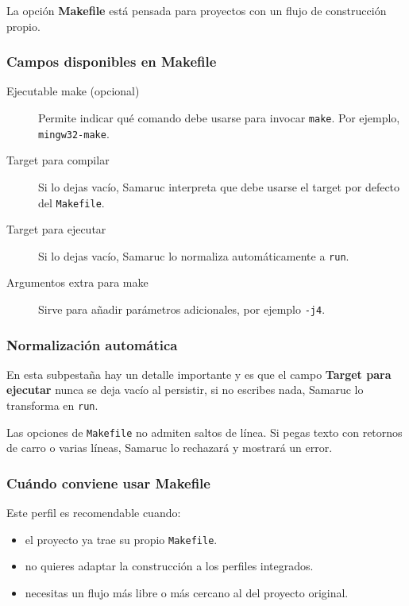 \documentclass[../../main.tex]{subfiles}
\begin{document}
La opción \textbf{Makefile} está pensada para proyectos con un flujo de construcción propio.

\subsubsection{Campos disponibles en Makefile}

\begin{description}
    \item[Ejecutable make (opcional)] Permite indicar qué comando debe usarse para invocar \texttt{make}. Por ejemplo, \texttt{mingw32-make}.
    \item[Target para compilar] Si lo dejas vacío, Samaruc interpreta que debe usarse el target por defecto del \texttt{Makefile}.
    \item[Target para ejecutar] Si lo dejas vacío, Samaruc lo normaliza automáticamente a \texttt{run}.
    \item[Argumentos extra para make] Sirve para añadir parámetros adicionales, por ejemplo \texttt{-j4}.
\end{description}

\subsubsection{Normalización automática}

En esta subpestaña hay un detalle importante y es que el campo \textbf{Target para ejecutar} nunca se deja vacío al persistir, si no escribes nada, Samaruc lo transforma en \texttt{run}.

Las opciones de \texttt{Makefile} no admiten saltos de línea. Si pegas texto con retornos de carro o varias líneas, Samaruc lo rechazará y mostrará un error.

\subsubsection{Cuándo conviene usar Makefile}

Este perfil es recomendable cuando:

\begin{itemize}
    \item el proyecto ya trae su propio \texttt{Makefile}.
    \item no quieres adaptar la construcción a los perfiles integrados.
    \item necesitas un flujo más libre o más cercano al del proyecto original.
\end{itemize}
\end{document}
